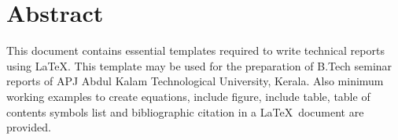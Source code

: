 \chapter*{Abstract}%
%

This document contains essential templates required to write technical
reports using \LaTeX. This template may be used for the preparation of B.Tech seminar reports of APJ Abdul Kalam Technological University, Kerala. Also minimum working examples to create equations, include figure, include table, table of contents symbols list and bibliographic citation in a \LaTeX\ document are provided.\\

\thispagestyle{plain}

